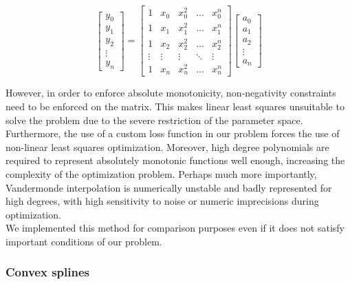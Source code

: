 \documentclass[12pt,a4paper]{article}
\begin{document}
\begin{equation}
\begin{bmatrix}
y_0 \\ y_1 \\ y_2 \\ \vdots \\ y_n
\end{bmatrix}
=
\begin{bmatrix}
1 & x_0 & x_0^2 & \dots & x_0^n \\
1 & x_1 & x_1^2 & \dots & x_1^n \\
1 & x_2 & x_2^2 & \dots & x_2^n \\
\vdots & \vdots & \vdots & \ddots & \vdots \\
1 & x_n & x_n^2 & \dots & x_n^n
\end{bmatrix}
\begin{bmatrix}
a_0 \\ a_1 \\ a_2 \\ \vdots \\ a_n
\end{bmatrix}
\end{equation}

However, in order to enforce absolute monotonicity, non-negativity constraints need to be enforced on the matrix. This makes linear least squares unsuitable to solve the problem due to the severe restriction of the parameter space. Furthermore, the use of a custom loss function in our problem forces the use of non-linear least squares optimization. Moreover, high degree polynomials are required to represent absolutely monotonic functions well enough, increasing the complexity of the optimization problem. Perhaps much more importantly, Vandermonde interpolation is numerically unstable and badly represented for high degrees, with high sensitivity to noise or numeric imprecisions during optimization.\\

We implemented this method for comparison purposes even if it does not satisfy important conditions of our problem.

\subsubsection{Convex splines}
\label{convex_splines}
\end{document}
